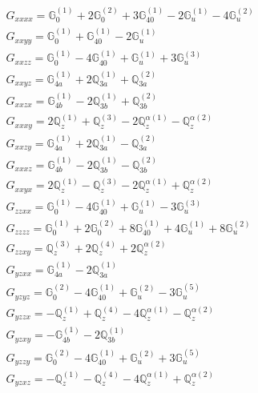 \documentclass[fleqn,8pt,landscape]{jsarticle}
\begin{document}
\begin{align*}
& G_{xxxx} = \mathbb{G}_{0}^{(1)} + 2 \mathbb{G}_{0}^{(2)} + 3 \mathbb{G}_{40}^{(1)} - 2 \mathbb{G}_{u}^{(1)} - 4 \mathbb{G}_{u}^{(2)} \\
& G_{xxyy} = \mathbb{G}_{0}^{(1)} + \mathbb{G}_{40}^{(1)} - 2 \mathbb{G}_{u}^{(1)} \\
& G_{xxzz} = \mathbb{G}_{0}^{(1)} - 4 \mathbb{G}_{40}^{(1)} + \mathbb{G}_{u}^{(1)} + 3 \mathbb{G}_{u}^{(3)} \\
& G_{xxyz} = \mathbb{G}_{4a}^{(1)} + 2 \mathbb{Q}_{3a}^{(1)} + \mathbb{Q}_{3a}^{(2)} \\
& G_{xxzx} = \mathbb{G}_{4b}^{(1)} - 2 \mathbb{Q}_{3b}^{(1)} + \mathbb{Q}_{3b}^{(2)} \\
& G_{xxxy} = 2 \mathbb{Q}_{z}^{(1)} + \mathbb{Q}_{z}^{(3)} - 2 \mathbb{Q}_{z}^{\alpha(1)} - \mathbb{Q}_{z}^{\alpha(2)} \\
& G_{xxzy} = \mathbb{G}_{4a}^{(1)} + 2 \mathbb{Q}_{3a}^{(1)} - \mathbb{Q}_{3a}^{(2)} \\
& G_{xxxz} = \mathbb{G}_{4b}^{(1)} - 2 \mathbb{Q}_{3b}^{(1)} - \mathbb{Q}_{3b}^{(2)} \\
& G_{xxyx} = 2 \mathbb{Q}_{z}^{(1)} - \mathbb{Q}_{z}^{(3)} - 2 \mathbb{Q}_{z}^{\alpha(1)} + \mathbb{Q}_{z}^{\alpha(2)} \\
& G_{zzxx} = \mathbb{G}_{0}^{(1)} - 4 \mathbb{G}_{40}^{(1)} + \mathbb{G}_{u}^{(1)} - 3 \mathbb{G}_{u}^{(3)} \\
& G_{zzzz} = \mathbb{G}_{0}^{(1)} + 2 \mathbb{G}_{0}^{(2)} + 8 \mathbb{G}_{40}^{(1)} + 4 \mathbb{G}_{u}^{(1)} + 8 \mathbb{G}_{u}^{(2)} \\
& G_{zzxy} = \mathbb{Q}_{z}^{(3)} + 2 \mathbb{Q}_{z}^{(4)} + 2 \mathbb{Q}_{z}^{\alpha(2)} \\
& G_{yzxx} = \mathbb{G}_{4a}^{(1)} - 2 \mathbb{Q}_{3a}^{(1)} \\
& G_{yzyz} = \mathbb{G}_{0}^{(2)} - 4 \mathbb{G}_{40}^{(1)} + \mathbb{G}_{u}^{(2)} - 3 \mathbb{G}_{u}^{(5)} \\
& G_{yzzx} = - \mathbb{Q}_{z}^{(1)} + \mathbb{Q}_{z}^{(4)} - 4 \mathbb{Q}_{z}^{\alpha(1)} - \mathbb{Q}_{z}^{\alpha(2)} \\
& G_{yzxy} = - \mathbb{G}_{4b}^{(1)} - 2 \mathbb{Q}_{3b}^{(1)} \\
& G_{yzzy} = \mathbb{G}_{0}^{(2)} - 4 \mathbb{G}_{40}^{(1)} + \mathbb{G}_{u}^{(2)} + 3 \mathbb{G}_{u}^{(5)} \\
& G_{yzxz} = - \mathbb{Q}_{z}^{(1)} - \mathbb{Q}_{z}^{(4)} - 4 \mathbb{Q}_{z}^{\alpha(1)} + \mathbb{Q}_{z}^{\alpha(2)}
\end{align*}
\end{document}
